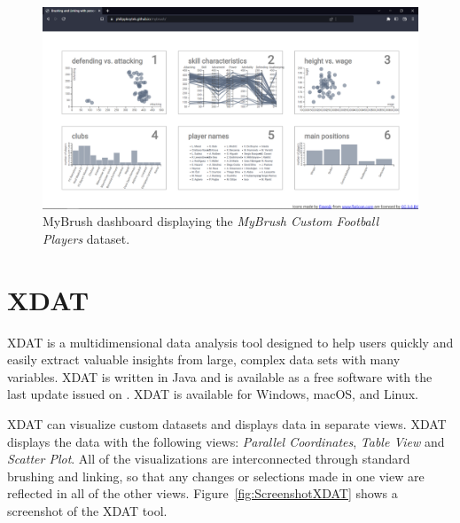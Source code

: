 \begin{figure}[tp]
\centering
\includegraphics[keepaspectratio,width=\linewidth,height=\halfh]
{images/screenshot-mybrush.png}

\caption[MyBrush Dashboard Screenshot]
{%
MyBrush dashboard displaying the \emph{MyBrush Custom Football Players} dataset.
}
\label{fig:ScreenshotMyBrush}
\end{figure}




\section{XDAT}

XDAT \parencite{XDAT} is a multidimensional data analysis tool
designed to help users quickly and easily extract valuable insights
from large, complex data sets with many variables. XDAT is written in
Java and is available as a free software with the last update issued
on . XDAT is available for Windows, 
macOS, and Linux.

XDAT can visualize custom datasets and displays data in separate views. XDAT
displays the data with the following views: \emph{Parallel Coordinates},
\emph{Table View} and \emph{Scatter Plot}. All of the visualizations are
interconnected through standard brushing and linking, so that any changes or
selections made in one view are reflected in all of the other views.
Figure~\ref{fig:ScreenshotXDAT} shows a screenshot of the XDAT tool.




